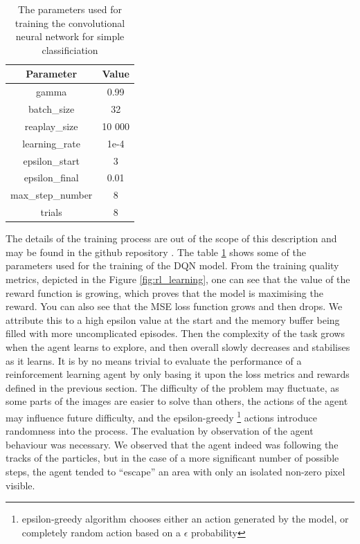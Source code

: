 \begin{table}[h]
\begin{center}
\begin{tabular}{ |c|c|}
\hline
Parameter & Value\\
\hline
gamma & 0.99 \\
batch\_size & 32 \\
reaplay\_size & 10 000 \\
learning\_rate & 1e-4\\
epsilon\_start & 3\\
epsilon\_final & 0.01 \\
max\_step\_number & 8 \\
trials & 8 \\

\hline
\end{tabular}
\caption{\label{tab:rl_params} The parameters used for training the convolutional neural network for simple classificiation}
\end{center}
\end{table}
The details of the training process are out of the scope of this description and may be found in the github repository \cite{dqn_lartpc}.
The table \ref{tab:rl_params} shows some of the parameters used for the training of the DQN model.
From the training quality metrics, depicted in the Figure \ref{fig:rl_learning}, one can see that the value of the reward function is growing, which proves that the model is maximising the reward. You can also see that the MSE loss function grows and then drops. We attribute this to a high epsilon value at the start and the memory buffer being filled with more uncomplicated episodes. Then the complexity of the task grows when the agent learns to explore, and then overall slowly decreases and stabilises as it learns.
It is by no means trivial to evaluate the performance of a reinforcement learning agent by only basing it upon the loss metrics and rewards defined in the previous section. The difficulty of the problem may fluctuate, as some parts of the images are easier to solve than others, the actions of the agent may influence future difficulty, and the epsilon-greedy \footnote{epsilon-greedy algorithm chooses either an action generated by the model, or completely random action based on a $\epsilon$ probability} actions introduce randomness into the process. The evaluation by observation of the agent behaviour was necessary.
We observed that the agent indeed was following the tracks of the particles, but in the case of a more significant number of possible steps, the agent tended to ``escape'' an area with only an isolated non-zero pixel visible.

